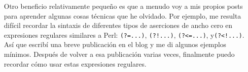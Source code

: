 \documentclass[12pt,]{krantz}
\theoremstyle{definition}
\theoremstyle{definition}
\theoremstyle{definition}
\theoremstyle{remark}
\begin{document}
Otro beneficio relativamente pequeño es que a menudo voy a mis propios
posts para aprender algunas cosas técnicas que he olvidado. Por ejemplo,
me resulta difícil recordar la sintaxis de diferentes tipos de
aserciones de ancho cero en expresiones regulares similares a Perl:
\texttt{(?=...)}, \texttt{(?!...)}, \texttt{(?\textless{}=...)},
y\texttt{(?\textless{}!...)}. Así que escribí una breve publicación en
el blog y me di algunos ejemplos mínimos. Después de volver a esa
publicación varias veces, finalmente puedo recordar cómo usar estas
expresiones regulares.



\backmatter
\printindex
\end{document}
